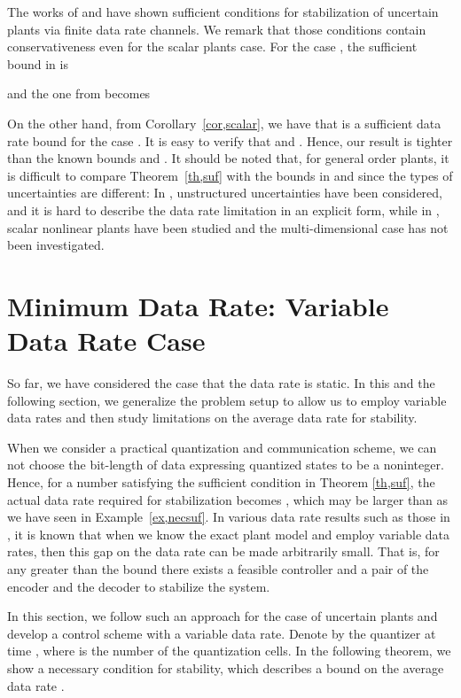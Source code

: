 \documentclass[a4paper, 11pt]{article}
\theoremstyle{definition}
\begin{document}
The works of \cite{Phat2004} and \cite{Martins2006} have shown sufficient
conditions for stabilization of uncertain plants via finite data rate
channels.
We remark that those conditions contain conservativeness even for the
scalar plants case.
For the case , the sufficient bound in \cite{Phat2004} is

and the one from \cite{Martins2006} becomes

On the other hand, from Corollary~\ref{cor,scalar}, we have that  is
a sufficient data rate bound for the case .
It is easy to verify that  and .
Hence, our result is tighter than the known bounds  and .
It should be noted that, for general order plants, it is difficult to compare
Theorem~\ref{th,suf} with the bounds in \cite{Phat2004} and \cite{Martins2006}
since the types of uncertainties are different:
In \cite{Phat2004}, unstructured uncertainties have been considered, and it is
hard to describe the data rate limitation in an explicit form,
while in \cite{Martins2006}, scalar nonlinear plants have been studied and
the multi-dimensional case has not been investigated.


\section{Minimum Data Rate: Variable Data Rate Case}\label{sec,average}
So far, we have considered the case that the data rate is static.
In this and the following section, we generalize the problem setup to allow
us to employ variable data rates and then study limitations on the average
data rate for stability.

When we consider a practical quantization and communication scheme, we
can not choose the bit-length of data expressing quantized states to be
a noninteger.
Hence, for a number  satisfying the sufficient condition in Theorem
\ref{th,suf}, the actual data rate required for stabilization becomes ,
which may be larger than  as we have seen in Example~\ref{ex,necsuf}.
In various data rate results such as those in \cite{Tatikonda2004, Nair2004, You2010},
it is known that when we know the exact plant model and employ variable
data rates, then this gap on the data rate can be made arbitrarily small.
That is, for any  greater than the bound there exists a feasible controller and a pair of the encoder and the decoder
to stabilize the system.

In this section, we follow such an approach for the case of uncertain plants
and develop a control scheme with a variable data rate.
Denote by  the quantizer at time , where  is the number
of the quantization cells.
In the following theorem, we show a necessary condition for stability,
which describes a bound on the average data rate
.
\end{document}

